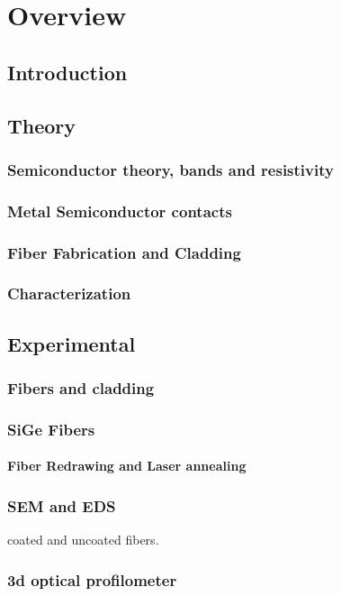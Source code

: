 \chapter{Overview}
\section{Introduction}
\section{Theory}

\subsection{Semiconductor theory, bands and resistivity}
\subsection{Metal Semiconductor contacts}
\subsection{Fiber Fabrication and Cladding}
\subsection{Characterization}


\section{Experimental}
\subsection{Fibers and cladding}
\subsection{SiGe Fibers}
\subsubsection{Fiber Redrawing and Laser annealing}
\subsection{SEM and EDS} 
coated and uncoated fibers. 
\subsection{3d optical profilometer}
